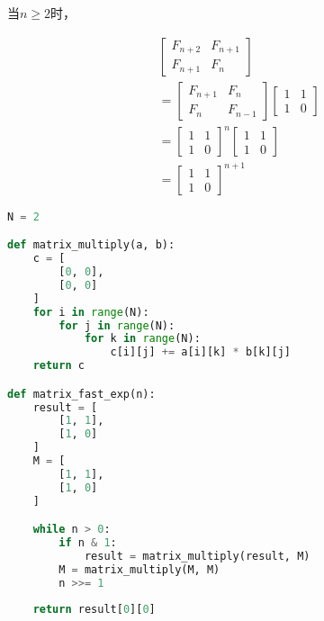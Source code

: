 \vspace{-1cm}

当$ n \ge 2 $时，

\vspace{-1cm}

\begin{align*}
	 & \left[\begin{matrix} F_{n+2} & F_{n+1}\\ F_{n+1} & F_n \end{matrix} \right]         \\
	 & = \left[\begin{matrix} F_{n+1} & F_{n}\\ F_{n} & F_{n-1} \end{matrix} \right]
	\left[\begin{matrix} 1 & 1\\ 1 & 0 \end{matrix} \right]            \\
	 & = \left[\begin{matrix} 1 & 1\\ 1 & 0 \end{matrix} \right]^n
	\left[\begin{matrix} 1 & 1\\ 1 & 0 \end{matrix} \right]            \\
	 & = \left[\begin{matrix} 1 & 1\\ 1 & 0 \end{matrix} \right]^{n+1}
\end{align*}


\begin{lstlisting}[language=Python]
N = 2

def matrix_multiply(a, b):
    c = [
        [0, 0],
        [0, 0]
    ]
    for i in range(N):
        for j in range(N):
            for k in range(N):
                c[i][j] += a[i][k] * b[k][j]
    return c

def matrix_fast_exp(n):
    result = [
        [1, 1],
        [1, 0]
    ]
    M = [
        [1, 1],
        [1, 0]
    ]

    while n > 0:
        if n & 1:
            result = matrix_multiply(result, M)
        M = matrix_multiply(M, M)
        n >>= 1
    
    return result[0][0]
\end{lstlisting}

\newpage

